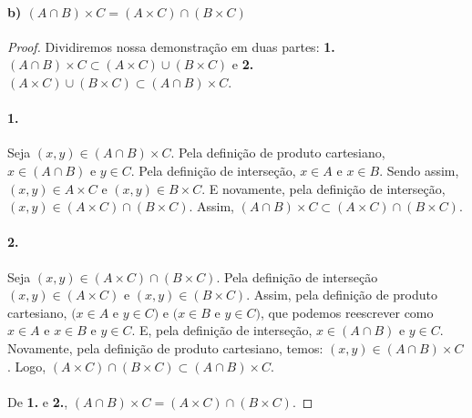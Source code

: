 \documentclass[9pt,twocolumn,a4paper]{article}
\begin{document}
    \paragraph{b) $(A \cap B) \times C = (A \times C) \cap (B \times C)$}
    \begin{proof}
    Dividiremos nossa demonstração em duas partes: \textbf{1.} $(A \cap B) \times C \subset (A \times C) \cup (B \times C)$ e \textbf{2.} $(A \times C) \cup (B \times C) \subset (A \cap B) \times C$.

    \paragraph{1.}
    Seja $(x, y) \in (A \cap B) \times C$. Pela definição de produto cartesiano, $x \in (A \cap B)$ e $y \in C$. Pela definição de interseção, $x \in A$ e $x \in B$. Sendo assim, $(x, y) \in A \times C$ e $(x, y) \in B \times C$. E novamente, pela definição de interseção, $(x, y) \in (A \times C) \cap (B \times C)$. Assim, $(A \cap B) \times C \subset (A \times C) \cap (B \times C)$.

    \paragraph{2.}
    Seja $(x, y) \in (A \times C) \cap (B \times C)$. Pela definição de interseção $(x, y) \in (A \times C)$ e $(x, y) \in (B \times C)$. Assim, pela definição de produto cartesiano, $(x \in A$ e $y \in C)$ e $(x \in B$ e $y \in C)$, que podemos reescrever como $x \in A$ e $x \in B$ e $y \in C$. E, pela definição de interseção, $x \in (A \cap B)$ e $y \in C$. Novamente, pela definição de produto cartesiano, temos: $(x, y) \in (A \cap B) \times C$. Logo, $(A \times C) \cap (B \times C) \subset (A \cap B) \times C$.

    \paragraph{}
    De \textbf{1.} e \textbf{2.}, $(A \cap B) \times C = (A \times C) \cap (B \times C)$.
    \end{proof}
\end{document}
